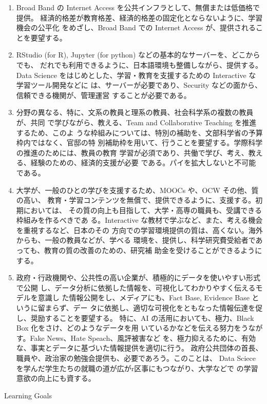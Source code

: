 \documentclass[
]{book}
\theoremstyle{definition}
\theoremstyle{definition}
\theoremstyle{definition}
\theoremstyle{definition}
\theoremstyle{remark}
\begin{document}
\begin{enumerate}
\def\labelenumi{\arabic{enumi}.}
\item
  Broad Band の Internet Access を公共インフラとして、無償または低価格で提供。 経済的格差が教育格差、経済的格差の固定化とならないように、学習機会の公平化 をめざし、Broad Band での Internet Access が、提供されることを要望する。
\item
  RStudio (for R), Jupyter (for python) などの基本的なサーバーを、どこからでも、 だれでも利用できるように、日本語環境も整備しながら、提供する。Data Science をはじめとした、学習・教育を支援するための Interactive な学習ツール開発などに は、サーバーが必要であり、Security などの面から、信頼できる機関が、管理運営 することが必要である。
\item
  分野の異なる、特に、文系の教員と理系の教員、社会科学系の複数の教員が、共同 で学びながら、教える、Team and Collaborative Teaching を推進するため、このよ うな枠組みについては、特別の補助を、文部科学省の予算枠内ではなく、官邸の特 別補助枠を用いて、行うことを要望する。学際科学の推進のためには、教員の教育 学習が必須であり、共働で学び、考え、教える、経験のための、経済的支援が必要 である。パイを拡大しないと不可能である。
\item
  大学が、一般のひとの学びを支援するため、MOOCs や、OCW その他、質の高い、 教育・学習コンテンツを無償で、提供できるように、支援する。初期においては、 その質の向上も目指して、大学・高専の職員も、受講できる枠組みを作るべきであ る。Interactive な教材で学ぶなど、また、考える機会を重視するなど、日本のその 方向での学習環境提供の質は、高くない。海外からも、一般の教員などが、学べる 環境を、提供し、科学研究費受給者であっても、教育の質の改善のための、研究補 助金を受けることができるようにする。
\item
  政府・行政機関や、公共性の高い企業が、積極的にデータを使いやすい形式で公開 し、データ分析に依拠した情報を、可視化してわかりやすく伝えるモデルを意識し た情報公開をし、メディアにも、Fact Base, Evidence Base というに留まらず、デー タに依拠し、適切な可視化をともなった情報伝達を促し、奨励することを要望する。 特に、AI の活用においても、極力、Black Box 化をさけ、どのようなデータを用 いているかなどを伝える努力をうながす。Fake News、Hate Speach、風評被害など を、極力抑えるために、有効な、事実とデータに基づいた情報提供を適切に行う。 政府公共団体の首長、職員や、政治家の勉強会提供も、必要であろう。このことは、 Data Sciece を学んだ学生たちの就職の道が広がr区事にもつながり、大学などで の学習意欲の向上にも資する。
\end{enumerate}

Learning Goals
\end{document}
